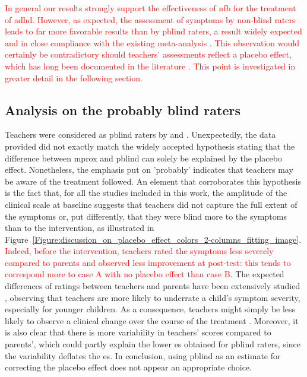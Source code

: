 \textcolor{red}{In general our results strongly support the effectiveness of \gls{nfb} for the treatment of \gls{adhd}. However, as expected, the assessment of symptoms by non-blind raters 
leads to far more favorable results than by \gls{pblind} raters, a result widely expected and in close compliance with the existing 
meta-analysis \citep{Cortese2016, Micoulaud2014}. This observation would certainly be contradictory should teachers’ 
assessments reflect a placebo effect, which has long been documented in the literature \citep{Sollie2013, Narad2015, Minder2018}. 
This point is investigated in greater detail in the following section.}

\subsection{Analysis on the probably blind raters}

Teachers were considered as \gls{pblind} raters by \citeauthor{Cortese2016} and \citeauthor{Micoulaud2014}.
Unexpectedly, the data provided did not exactly match the widely accepted hypothesis stating that the difference between
\gls{mprox} and \gls{pblind} can solely be explained by the placebo effect. 
Nonetheless, the emphasis put on 'probably' indicates that teachers may be aware of the treatment followed. 
An element that corroborates this hypothesis is the fact that, for all the studies included in this work, the amplitude 
of the clinical scale at baseline suggests that teachers did not capture the full extent of the symptoms or, put differently, 
that they were blind more to the symptoms than to the intervention, as illustrated 
in Figure~\ref{Figure:discussion_on_placebo_effect_colors_2-columns_fitting_image}. 
\textcolor{red}{Indeed, before the intervention, teachers rated the symptoms less severely compared to parents and observed less improvement at post-test: 
this tends to correspond more to case A with no placebo effect than case B}. The expected differences of ratings between 
teachers and parents have been extensively studied \citep{Sollie2013, Narad2015, Minder2018}, observing that teachers are more 
likely to underrate a child's symptom severity, especially for younger children. As a consequence, teachers might simply be less likely 
to observe a clinical change over the course of the treatment \citep{Sollie2013, Narad2015, Minder2018}. Moreover, it is also clear 
that there is more variability in teachers' scores compared to parents', which could partly explain the lower \gls{es} obtained for 
\gls{pblind} raters, since the variability deflates the \gls{es}. In conclusion, using \gls{pblind} as an estimate for correcting the 
placebo effect does not appear an appropriate choice. 

